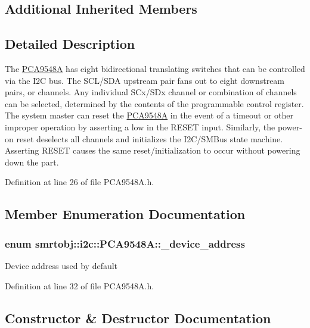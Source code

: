 \subsection*{Additional Inherited Members}


\subsection{Detailed Description}
The \hyperlink{classsmrtobj_1_1i2c_1_1_p_c_a9548_a}{P\+C\+A9548\+A} has eight bidirectional translating switches that can be controlled via the I2\+C bus. The S\+C\+L/\+S\+D\+A upstream pair fans out to eight downstream pairs, or channels. Any individual S\+Cx/\+S\+Dx channel or combination of channels can be selected, determined by the contents of the programmable control register. The system master can reset the \hyperlink{classsmrtobj_1_1i2c_1_1_p_c_a9548_a}{P\+C\+A9548\+A} in the event of a timeout or other improper operation by asserting a low in the R\+E\+S\+E\+T input. Similarly, the power-\/on reset deselects all channels and initializes the I2\+C/\+S\+M\+Bus state machine. Asserting R\+E\+S\+E\+T causes the same reset/initialization to occur without powering down the part. 

Definition at line 26 of file P\+C\+A9548\+A.\+h.



\subsection{Member Enumeration Documentation}
\hypertarget{classsmrtobj_1_1i2c_1_1_p_c_a9548_a_af9c75361cf8673778debf8a0822e1637}{}
\subsubsection[{\+\_\+device\+\_\+address}]{\setlength{\rightskip}{0pt plus 5cm}enum {\bf smrtobj\+::i2c\+::\+P\+C\+A9548\+A\+::\+\_\+device\+\_\+address}}\label{classsmrtobj_1_1i2c_1_1_p_c_a9548_a_af9c75361cf8673778debf8a0822e1637}
Device address used by default 

Definition at line 32 of file P\+C\+A9548\+A.\+h.



\subsection{Constructor \& Destructor Documentation}
\hypertarget{classsmrtobj_1_1i2c_1_1_p_c_a9548_a_a5da9ee25001c545a42d15f09ed540369}{}
